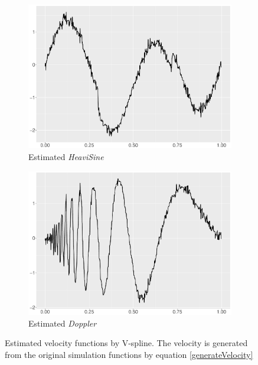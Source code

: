\begin{figure}
\begin{subfigure}{0.45\textwidth}
    \includegraphics[width=\textwidth]{Chapters/02TractorSplineTheory/plot/ggplot/ggHeaviSineTractorVelocity.pdf}
    \caption{Estimated \textit{HeaviSine}  }
    \end{subfigure}
    \begin{subfigure}{0.45\textwidth}
    \centering
    \includegraphics[width=\textwidth]{Chapters/02TractorSplineTheory/plot/ggplot/ggDopplerTractorVelocity.pdf}
    \caption{Estimated \textit{Doppler}  }
    \end{subfigure}
\caption{Estimated velocity functions by V-spline. The velocity is generated from the original simulation functions by equation \eqref{generateVelocity}}\label{numvtractor}
 \end{figure}



